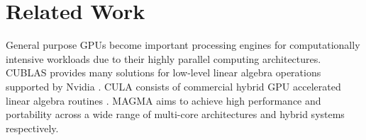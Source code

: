\section{Related Work}
\label{sec:related}
General purpose GPUs become important processing engines for computationally intensive workloads due to their highly parallel computing architectures.
CUBLAS provides many solutions for low-level linear algebra operations supported by Nvidia \cite{cublas}. 
CULA consists of commercial hybrid GPU accelerated linear algebra routines \cite{cula}.
MAGMA aims to achieve high performance and portability across a wide range of multi-core architectures and hybrid systems respectively\cite{magma}.


